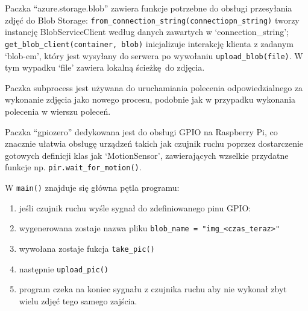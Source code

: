 \documentclass{article}
\begin{document}
Paczka ``azure.storage.blob'' zawiera funkcje potrzebne do obsługi
przesyłania zdjęć do Blob Storage:
\texttt{from\_connection\_string(connectiopn\_string)} tworzy instancję
BlobServiceClient według danych zawartych w `connection\_string';
\texttt{get\_blob\_client(container,\ blob)} inicjalizuje interakcję
klienta z zadanym `blob-em', który jest wysyłany do serwera po wywołaniu
\texttt{upload\_blob(file)}. W tym wypadku `file' zawiera lokalną
ścieżkę~do zdjęcia.

Paczka subprocess jest używana do uruchamiania polecenia
odpowiedzialnego za wykonanie zdjęcia jako nowego procesu, podobnie jak
w przypadku wykonania polecenia w wierszu poleceń.

Paczka ``gpiozero'' dedykowana jest do obsługi GPIO na Raspberry Pi, co
znacznie ułatwia obsługę urządzeń takich jak czujnik ruchu poprzez
dostarczenie gotowych definicji klas jak `MotionSensor', zawierających
wzselkie przydatne funkcje np. \texttt{pir.wait\_for\_motion()}.

W \texttt{main()} znajduje się główna pętla programu:

\begin{enumerate}
\def\labelenumi{\arabic{enumi}.}
\item
  jeśli czujnik ruchu wyśle sygnał do zdefiniowanego pinu GPIO:
\item
  wygenerowana zostaje nazwa pliku
  \texttt{blob\_name\ =\ "img\_\textless{}czas\_teraz\textgreater{}"}
\item
  wywołana zostaje fukcja \texttt{take\_pic()}
\item
  następnie \texttt{upload\_pic()}
\item
  program czeka na koniec sygnału z czujnika ruchu aby nie wykonał zbyt
  wielu zdjęć tego samego zajścia.
\end{enumerate}
\end{document}
